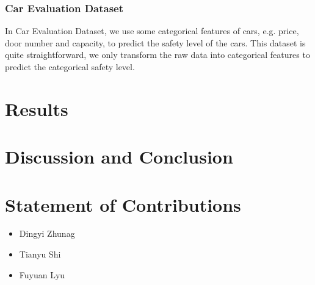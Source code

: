 \documentclass[11pt]{scrartcl}
\begin{document}
\subsubsection*{Car Evaluation Dataset}
In Car Evaluation Dataset, we use some categorical features of cars, e.g. price, door number and capacity, to predict the safety level of the cars. This dataset is quite straightforward, we only transform the raw data into categorical features to predict the categorical safety level.


\section{Results}

\section{Discussion and Conclusion}

\section{Statement of Contributions}

\begin{itemize}
	\item Dingyi Zhunag
	\item Tianyu Shi
	\item Fuyuan Lyu
\end{itemize}



\end{document}
